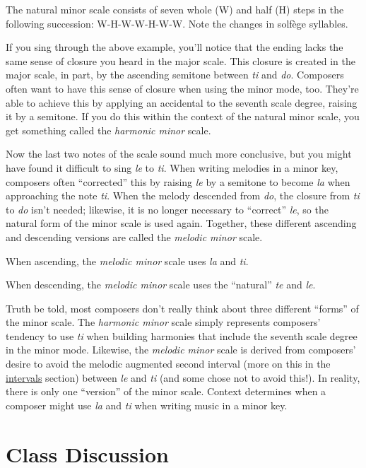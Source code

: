 \documentclass{book}
\begin{document}
The natural minor scale consists of seven whole (W) and half (H) steps in the
following succession: W-H-W-W-H-W-W. Note the changes in solfège syllables.

If you sing through the above example, you'll notice that the ending lacks the
same sense of closure you heard in the major scale. This closure is created in
the major scale, in part, by the ascending semitone between \emph{ti} and
\emph{do}. Composers often want to have this sense of closure when using the
minor mode, too. They're able to achieve this by applying an accidental to the
seventh scale degree, raising it by a semitone. If you do this within the
context of the natural minor scale, you get something called the
\emph{harmonic minor} scale.

Now the last two notes of the scale sound much more conclusive, but you might
have found it difficult to sing \emph{le} to \emph{ti}. When writing melodies
in a minor key, composers often ``corrected'' this by raising \emph{le} by a
semitone to become \emph{la} when approaching the note \emph{ti}. When the
melody descended from \emph{do}, the closure from \emph{ti} to \emph{do} isn't
needed; likewise, it is no longer necessary to ``correct'' \emph{le}, so the
natural form of the minor scale is used again. Together, these different
ascending and descending versions are called the \emph{melodic minor} scale.

When ascending, the \emph{melodic minor} scale uses \emph{la} and \emph{ti}.

When descending, the \emph{melodic minor} scale uses the ``natural'' \emph{te}
and \emph{le}.

Truth be told, most composers don't really think about three different
``forms'' of the minor scale. The \emph{harmonic minor} scale simply
represents composers' tendency to use \emph{ti} when building harmonies that
include the seventh scale degree in the minor mode. Likewise, the
\emph{melodic minor} scale is derived from composers' desire to avoid the
melodic augmented second interval (more on this in the
\href{intervals.html}{intervals} section) between \emph{le} and \emph{ti} (and
some chose not to avoid this!). In reality, there is only one ``version'' of
the minor scale. Context determines when a composer might use \emph{la} and
\emph{ti} when writing music in a minor key.

\hypertarget{class-discussion-10}{%
\section{Class Discussion}\label{class-discussion-10}}
\end{document}
